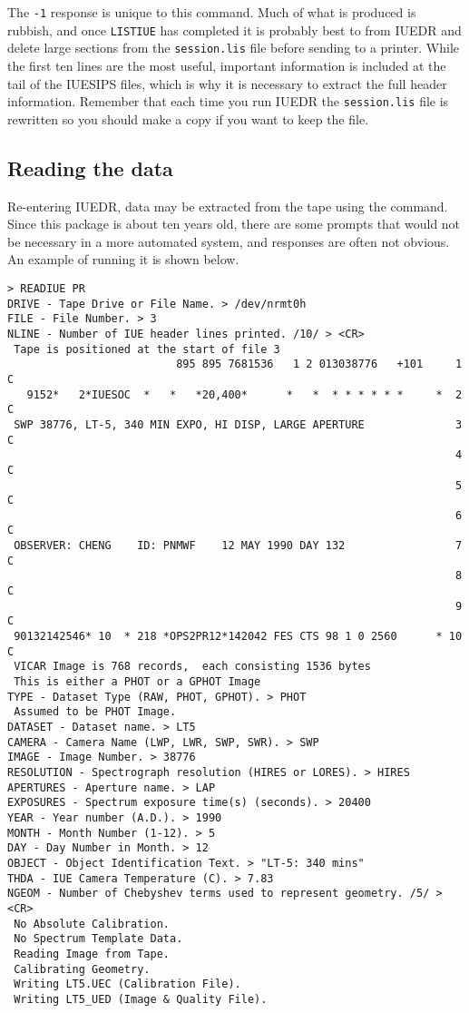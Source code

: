 The \verb+-1+ response is unique to this command.  Much of what is produced is
rubbish, and once \verb+LISTIUE+ has completed it is probably best
to  from IUEDR and delete large sections from 
the \verb+session.lis+
file before sending to a printer.  While the first ten lines are the most
useful, important information is included at the tail of the IUESIPS files,
which is why it is necessary to extract the full header information.  Remember
that each time you run IUEDR the \verb+session.lis+ file is rewritten so you
should make a copy if you want to keep the file.

\subsection{Reading the data}

Re-entering IUEDR, data may be extracted from the tape using the
command.  Since this package is about ten years old, there are some prompts
that would not be necessary in a more automated system, and responses are
often not obvious.  An example of running it is shown below.

\begin{verbatim}
> READIUE PR
DRIVE - Tape Drive or File Name. > /dev/nrmt0h
FILE - File Number. > 3
NLINE - Number of IUE header lines printed. /10/ > <CR>
 Tape is positioned at the start of file 3
                          895 895 7681536   1 2 013038776   +101     1  C
   9152*   2*IUESOC  *   *   *20,400*      *   *  * * * * * *     *  2  C
 SWP 38776, LT-5, 340 MIN EXPO, HI DISP, LARGE APERTURE              3  C
                                                                     4  C
                                                                     5  C
                                                                     6  C
 OBSERVER: CHENG    ID: PNMWF    12 MAY 1990 DAY 132                 7  C
                                                                     8  C
                                                                     9  C
 90132142546* 10  * 218 *OPS2PR12*142042 FES CTS 98 1 0 2560      * 10  C
 VICAR Image is 768 records,  each consisting 1536 bytes
 This is either a PHOT or a GPHOT Image
TYPE - Dataset Type (RAW, PHOT, GPHOT). > PHOT
 Assumed to be PHOT Image.
DATASET - Dataset name. > LT5
CAMERA - Camera Name (LWP, LWR, SWP, SWR). > SWP
IMAGE - Image Number. > 38776
RESOLUTION - Spectrograph resolution (HIRES or LORES). > HIRES
APERTURES - Aperture name. > LAP
EXPOSURES - Spectrum exposure time(s) (seconds). > 20400
YEAR - Year number (A.D.). > 1990
MONTH - Month Number (1-12). > 5
DAY - Day Number in Month. > 12
OBJECT - Object Identification Text. > "LT-5: 340 mins"
THDA - IUE Camera Temperature (C). > 7.83
NGEOM - Number of Chebyshev terms used to represent geometry. /5/ > <CR>
 No Absolute Calibration.
 No Spectrum Template Data.
 Reading Image from Tape.
 Calibrating Geometry.
 Writing LT5.UEC (Calibration File).
 Writing LT5_UED (Image & Quality File).
\end{verbatim}

